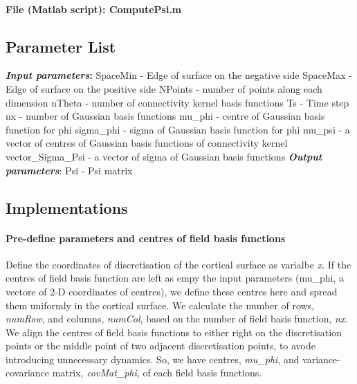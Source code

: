 \documentclass[a4paper, 12pt, english]{article}
\begin{document}
\paragraph{File (Matlab script): ComputePsi.m}


\subsection{Parameter List}
\textbf{\textit{Input parameters}:}\newline
SpaceMin - Edge of surface on the negative side \newline
SpaceMax - Edge of surface on the positive side \newline
NPoints - number of points along each dimension \newline
nTheta - number of connectivity kernel basis functions \newline
Ts - Time step \newline
nx - number of Gaussian basis functions \newline
mu\_phi - centre of Gaussian basis function for phi \newline
sigma\_phi - sigma of Gaussian basis function for phi \newline
mu\_psi - a vector of centres of Gaussian basis functions of connectivity kernel \newline
vector\_Sigma\_Psi - a vector of sigma of Gaussian basis functions \newline
\textbf{\textit{Output parameters}}:\newline
Psi - Psi matrix



\subsection{Implementations}

\paragraph{Pre-define parameters and centres of field basis functions\newline}
Define the coordinates of discretisation of the cortical surface as varialbe \textit{x}. If the centres of field basis function are left as empy the input parameters (mu\_phi, a
vectore of 2-D coordinates of centres), we define these centres here and spread them
uniformly in the cortical surface. \newline
We calculate the number of rows, \textit{numRow}, and columns, \textit{numCol}, based on the
number of field basis function, \textit{nx}.\newline
We align the centres of field basis functions to either right on the
discretisation points or the middle point of two adjacent discretisation
points, to avode introducing unnecessary dynamics. \newline
So, we have centres, \textit{mu\_phi}, and variance-covariance matrix, \textit{covMat\_phi},
of each field basis functions.\newline
\end{document}

